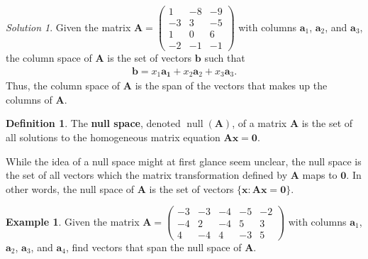 \documentclass[
]{book}
\theoremstyle{definition}
\newtheorem{definition}{Definition}[chapter]
\theoremstyle{definition}
\newtheorem{example}{Example}[chapter]
\theoremstyle{definition}
\theoremstyle{definition}
\theoremstyle{remark}
\newtheorem*{solution}{Solution}
\begin{document}
\begin{solution}
Given the matrix \(\mathbf{A} = \begin{pmatrix} 1 & -8 & -9 \\ -3 & 3 & -5 \\ 1 & 0 & 6 \\ -2 & -1 & -1 \end{pmatrix}\) with columns \(\mathbf{a}_1\), \(\mathbf{a}_2\), and \(\mathbf{a}_3\), the column space of \(\mathbf{A}\) is the set of vectors \(\mathbf{b}\) such that
\[
\begin{aligned}
\mathbf{b} = x_1 \mathbf{a_1} + x_2 \mathbf{a}_2 + x_3 \mathbf{a}_3.
\end{aligned}
\]
Thus, the column space of \(\mathbf{A}\) is the span of the vectors that makes up the columns of \(\mathbf{A}\).
\end{solution}

\begin{definition}
\protect\hypertarget{def:null-space}{}\label{def:null-space}The \textbf{null space}, denoted \(\operatorname{null}(\mathbf{A})\), of a matrix \(\mathbf{A}\) is the set of all solutions to the homogeneous matrix equation \(\mathbf{A} \mathbf{x} = \mathbf{0}\).
\end{definition}

While the idea of a null space might at first glance seem unclear, the null space is the set of all vectors which the matrix transformation defined by \(\mathbf{A}\) maps to \(\mathbf{0}\). In other words, the null space of \(\mathbf{A}\) is the set of vectors \(\{ \mathbf{x} : \mathbf{A} \mathbf{x} = \mathbf{0} \}\).

\begin{example}
Given the matrix \(\mathbf{A} = \begin{pmatrix} -3 & -3 & -4 & -5 & -2 \\ -4 & 2 & -4 & 5 & 3 \\ 4 & -4 & 4 & -3 & 5 \end{pmatrix}\) with columns \(\mathbf{a}_1\), \(\mathbf{a}_2\), \(\mathbf{a}_3\), and \(\mathbf{a}_4\), find vectors that span the null space of \(\mathbf{A}\).
\end{example}
\end{document}
